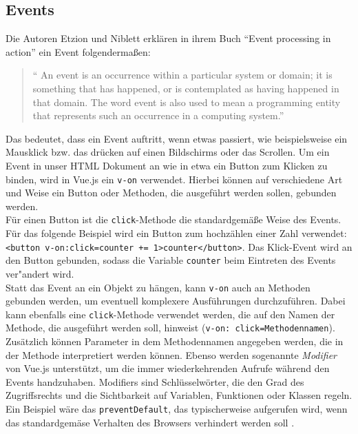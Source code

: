 \subsection*{Events}
Die Autoren Etzion und Niblett erkl\"aren in ihrem Buch \enquote{Event processing in action} ein Event folgenderma\ss{}en:
\begin{quotation}
\enquote{ An event is an occurrence within a particular system or domain; it is
something that has happened, or is contemplated as having happened in that
domain. The word event is also used to mean a programming entity that represents such an occurrence in a computing system\cite{Etzion&Niblett2011}.}
\end{quotation}
Das bedeutet, dass ein Event auftritt, wenn etwas passiert, wie beispielsweise ein Mausklick bzw. das dr\"ucken auf einen Bildschirms oder das Scrollen.
Um ein Event in unser \ac{HTML} Dokument an  wie in etwa ein Button zum Klicken zu binden, wird in Vue.js ein \texttt{v-on} verwendet. Hierbei k\"onnen auf verschiedene Art und Weise ein Button oder Methoden, die ausgef\"uhrt werden sollen, gebunden werden.\\
F\"ur einen Button ist die \texttt{click}-Methode die standardgem\"a\ss{}e Weise des Events. F\"ur das folgende Beispiel wird ein Button zum hochz\"ahlen einer Zahl verwendet: \texttt{<button v-on:click=\grqq counter += 1\grqq>{{counter}}</button>}\cite{VueDokumentationEvent2018}. Das Klick-Event wird an den Button gebunden, sodass die Variable \texttt{counter} beim Eintreten des Events ver"andert wird.\\
Statt das Event an ein Objekt zu h\"angen, kann \texttt{v-on} auch an Methoden gebunden werden, um eventuell komplexere Ausf\"uhrungen durchzuf\"uhren. Dabei  kann ebenfalls eine \texttt{click}-Methode verwendet werden, die auf den Namen der Methode, die ausgef\"uhrt werden soll, hinweist (\texttt{v-on: click=\grqq Methodennamen\grqq})\cite{VueDokumentationEvent2018}. Zus\"atzlich k\"onnen Parameter in dem Methodennamen angegeben werden, die in der Methode interpretiert werden k\"onnen. 
Ebenso werden sogenannte \textit{Modifier} von Vue.js unterst\"utzt, um die immer wiederkehrenden Aufrufe w\"ahrend den Events handzuhaben.
Modifiers sind Schl\"usselw\"orter, die den Grad des Zugriffsrechts und die Sichtbarkeit auf Variablen, Funktionen oder Klassen regeln.
Ein Beispiel w\"are das \texttt{preventDefault}, das typischerweise aufgerufen wird, wenn das standardgem\"ase Verhalten des Browsers verhindert werden soll \cite{VueDokumentationEvent2018}.

